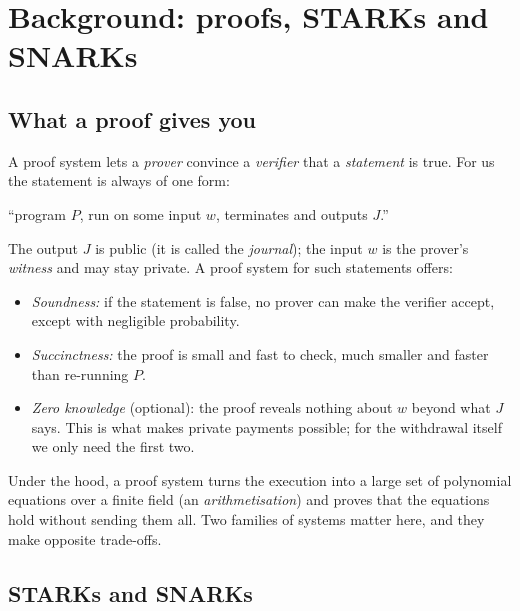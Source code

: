 \documentclass[11pt]{article}
\begin{document}
\section{Background: proofs, STARKs and SNARKs}
\label{sec:background}

\subsection{What a proof gives you}

A proof system lets a \emph{prover} convince a \emph{verifier} that a
\emph{statement} is true. For us the statement is always of one form:
\begin{center}
``program $P$, run on some input $w$, terminates and outputs $J$.''
\end{center}
The output $J$ is public (it is called the \emph{journal}); the input
$w$ is the prover's \emph{witness} and may stay private. A proof system
for such statements offers:
\begin{itemize}[leftmargin=1.5em]
\item \emph{Soundness:} if the statement is false, no prover can make
  the verifier accept, except with negligible probability.
\item \emph{Succinctness:} the proof is small and fast to check, much
  smaller and faster than re-running $P$.
\item \emph{Zero knowledge} (optional): the proof reveals nothing about
  $w$ beyond what $J$ says. This is what makes private payments
  possible; for the withdrawal itself we only need the first two.
\end{itemize}

Under the hood, a proof system turns the execution into a large set of
polynomial equations over a finite field (an \emph{arithmetisation}) and
proves that the equations hold without sending them all. Two families of
systems matter here, and they make opposite trade-offs.

\subsection{STARKs and SNARKs}
\end{document}
